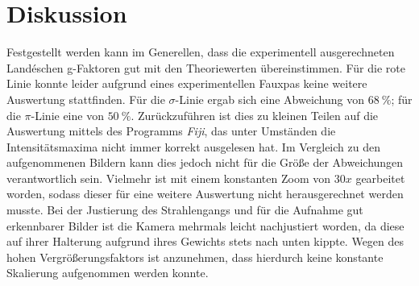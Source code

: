 \section{Diskussion}
Festgestellt werden kann im Generellen, dass die experimentell ausgerechneten Landéschen g-Faktoren gut mit den Theoriewerten übereinstimmen. Für die rote Linie konnte leider aufgrund eines experimentellen Fauxpas keine weitere Auswertung stattfinden.
Für die $\sigma$-Linie ergab sich eine Abweichung von $\SI{68}{\%}$; für die $\pi$-Linie eine von $\SI{50}{\%}$. Zurückzuführen ist dies zu kleinen Teilen auf die Auswertung mittels des Programms \textit{Fiji}, das unter Umständen die Intensitätsmaxima nicht immer korrekt ausgelesen hat. Im Vergleich zu den aufgenommenen Bildern kann dies jedoch nicht für die Größe der Abweichungen verantwortlich sein. Vielmehr ist mit einem konstanten Zoom von $30x$ gearbeitet worden, sodass dieser für eine weitere Auswertung nicht herausgerechnet werden musste. Bei der Justierung des Strahlengangs und für die Aufnahme gut erkennbarer Bilder ist die Kamera mehrmals leicht nachjustiert worden, da diese auf ihrer Halterung aufgrund ihres Gewichts stets nach unten kippte. Wegen des hohen Vergrößerungsfaktors ist anzunehmen, dass hierdurch keine konstante Skalierung aufgenommen werden konnte.
